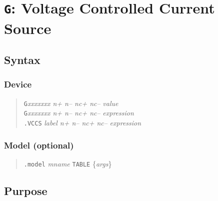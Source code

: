 %
%
%
%
\section{{\tt G}: Voltage Controlled Current Source}
\subsection{Syntax}
\subsubsection{Device}
\begin{verse}
{\tt G}{\it xxxxxxx n+ n-- nc+ nc--} {\it value}\\
{\tt G}{\it xxxxxxx n+ n-- nc+ nc--} {\it expression}\\
{\tt .VCCS} {\it label n+ n-- nc+ nc--} {\it expression}
\end{verse}
\subsubsection{Model (optional)}
\begin{verse}
{\tt .model} {\it mname} {\tt TABLE} \{{\it args}\}
\end{verse}
\subsection{Purpose}

